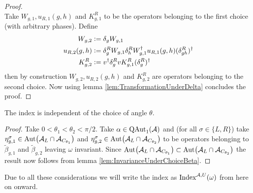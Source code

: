 \documentclass[12pt,a4paper,twoside]{article}
\numberwithin{equation}{section}
\begin{document}
\begin{proof}
\begin{equation}
	\end{equation}
	Take $W_{g,1},u_{R,1}(g,h)$ and $K^R_{g,1}$ to be the operators belonging to the first choice (with arbitrary phases). Define
	\begin{align}
		W_{g,2}&\defeq\delta_g W_{g,1}\\
		u_{R,2}(g,h)&\defeq \delta_g^R W_{g,1}\delta_h^R W_{g,1}^\dagger u_{R,1}(g,h)(\delta_{gh}^R)^\dagger\\
		K^R_{g,2}&\defeq v^\dagger \delta_g^R v K_{g,1}^R (\delta_g^R)^\dagger
	\end{align}
	then by construction $W_{g,2},u_{R,2}(g,h)$ and $K^R_{g,2}$ are operators belonging to the second choice. Now using lemma \ref{lem:TransformationUnderDelta} concludes the proof.
\end{proof}
\begin{lemma}
	The index is independent of the choice of angle $\theta$.
\end{lemma}
\begin{proof}
	Take $0<\theta_1<\theta_2<\pi/2$. Take $\alpha\in \QAut{\AA}$ and (for all $\sigma\in\{L,R\}$) take $\eta_{g,1}^\sigma\in\Aut{\AA_L\cap\AA_{C_{\theta_1}}}$ and $\eta_{g,2}^\sigma\in\Aut{\AA_L\cap\AA_{C_{\theta_2}}}$ to be operators belonging to $\tilde{\beta}_{g,1}$ and $\tilde{\beta}_{g,2}$ leaving $\omega$ invariant. Since $\Aut{\AA_L\cap\AA_{C_{\theta_1}}}\subset \Aut{\AA_L\cap\AA_{C_{\theta_2}}}$ the result now follows from lemma \ref{lem:InvarianceUnderChoiceBeta}.
\end{proof}
Due to all these considerations we will write the index as $\textrm{Index}^{\AA,U}(\omega)$ from here on onward.
\end{document}
